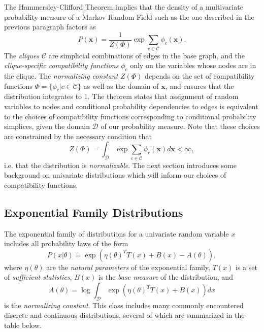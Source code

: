 \documentclass{samkoelleprelimworking}
\begin{document}
The Hammersley-Clifford Theorem implies that the density of a multivariate probability measure of a Markov Random Field such as the one described in the previous paragraph factors as
 \[P (\bm{x}) = \frac{1}{Z(\Phi)} \exp \sum_{c \in \mathcal{C}}\phi_c(\bm{x}).\]
The \textit{cliques} $\mathcal{C}$ are simplicial combinations of edges in the base graph, and the \textit{clique-specific compatibility functions} $\phi_c$ only on the variables whose nodes are in the clique.  The \textit{normalizing constant} $Z(\Phi)$ depends on the set of compatibility functions $\Phi = \{\phi_c \vert c \in \mathcal{C} \}$ as well as the domain of $\bm{x}$, and ensures that the distribution integrates to $1$.  The theorem states that assignment of random variables to nodes and conditional probability dependencies to edges is equivalent to the choices of compatibility functions corresponding to conditional probability simplices, given the domain $\mathcal{D}$ of our probability measure.  Note that these choices are constrained by the necessary condition that 
\[Z(\Phi) = \int_\mathcal{D} \exp \sum_{c \in \mathcal{C}}\phi_c(\bm{x}) d\bm{x} < \infty,\]
i.e. that the distribution is \textit{normalizable}.  The next section introduces some background on univariate distributions which will inform our choices of compatibility functions.
 
\subsection{Exponential Family Distributions}

The exponential family of distributions for a univariate random variable $x$ includes all probability laws of the form
  \[P(x|\theta) = \exp(\eta(\theta)^T T(x) + B(x) - A(\theta)),\]
  where $\eta(\theta)$ are the \textit{natural parameters} of the exponential family, $T(x)$ is a set of \textit{sufficient statistics}, $B(x)$ is the \textit{base measure} of the distribution, and 
  \[A(\theta) = \log \int_{\mathcal{D}} \exp(\eta(\theta)^T T(x) + B(x))dx\]
  is the \textit{normalizing constant}.   This class includes many commonly encountered discrete and continuous distributions, several of which are summarized in the table below.
\end{document}
